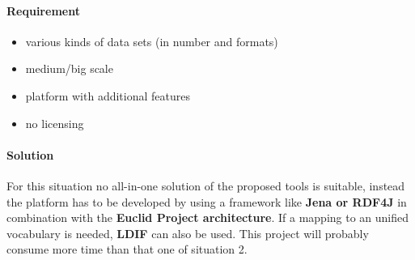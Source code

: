 \paragraph{Requirement}
\begin{itemize}
\item various kinds of data sets (in number and formats)
\item medium/big scale
\item platform with additional features
\item no licensing
\end{itemize}

\paragraph{Solution}
For this situation no all-in-one solution of the proposed tools is suitable, instead the platform has to be developed by using a framework like \textbf{Jena or RDF4J} in combination with the \textbf{Euclid Project architecture}. If a mapping to an unified vocabulary is needed, \textbf{LDIF} can also be used. This project will probably consume more time than that one of situation 2.